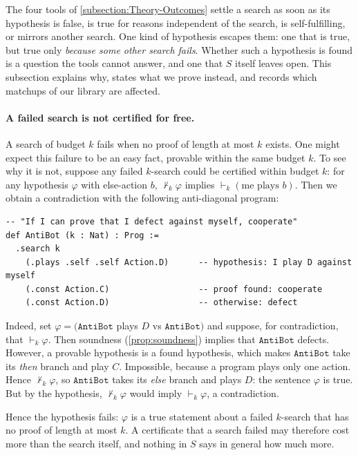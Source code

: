 \documentclass[twoside,11pt]{article}
\begin{document}
The four tools of \cref{subsection:Theory-Outcomes} settle a search as soon as its hypothesis is false, is true for reasons independent of the search, is self-fulfilling, or mirrors another search. One kind of hypothesis escapes them: one that is true, but true only \emph{because some other search fails}. Whether such a hypothesis is found is a question the tools cannot answer, and one that $S$ itself leaves open. This subsection explains why, states what we prove instead, and records which matchups of our library are affected.

\paragraph{A failed search is not certified for free.}
A search of budget $k$ fails when no proof of length at most $k$ exists. One might expect this failure to be an easy fact, provable within the same budget $k$. To see why it is not, suppose any failed $k$-search could be certified within budget $k$: for any hypothesis $\varphi$ with else-action $b$, $\nvdash_k \varphi$ implies $\vdash_k (\text{me plays } b)$. Then we obtain a contradiction with the following anti-diagonal program:
\begin{lstlisting}[style=pdlean]
-- "If I can prove that I defect against myself, cooperate"
def AntiBot (k : Nat) : Prog :=
  .search k
    (.plays .self .self Action.D)      -- hypothesis: I play D against myself
    (.const Action.C)                  -- proof found: cooperate
    (.const Action.D)                  -- otherwise: defect
\end{lstlisting}
Indeed, set $\varphi = (\texttt{AntiBot}$ plays $D$ vs $\texttt{AntiBot})$ and suppose, for contradiction, that $\vdash_k \varphi$. Then soundness (\cref{prop:soundness}) implies that $\texttt{AntiBot}$ defects. However, a provable hypothesis is a found hypothesis, which makes $\texttt{AntiBot}$ take its \emph{then} branch and play $C$. Impossible, because a program plays only one action. Hence $\nvdash_k \varphi$, so $\texttt{AntiBot}$ takes its \emph{else} branch and plays $D$: the sentence $\varphi$ is true. But by the hypothesis, $\nvdash_k \varphi$ would imply $\vdash_k \varphi$, a contradiction.

Hence the hypothesis fails: $\varphi$ is a true statement about a failed $k$-search that has no proof of length at most $k$. A certificate that a search failed may therefore cost more than the search itself, and nothing in $S$ says in general how much more.
\end{document}
